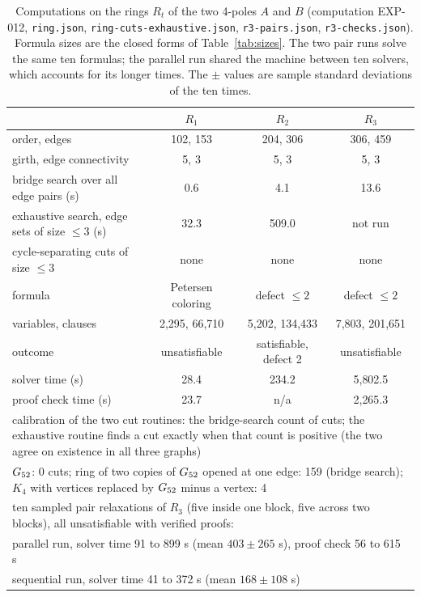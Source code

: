 \begin{table}[t]\centering\footnotesize
\setlength{\tabcolsep}{3pt}
\begin{tabular}{lccc}
\toprule
 & $R_1$ & $R_2$ & $R_3$ \\
\midrule
order, edges & 102, 153 & 204, 306 & 306, 459 \\
girth, edge connectivity & 5, 3 & 5, 3 & 5, 3 \\
bridge search over all edge pairs (s) & 0.6 & 4.1 & 13.6 \\
exhaustive search, edge sets of size $\le 3$ (s) & 32.3 & 509.0 & not run \\
cycle-separating cuts of size $\le 3$ & none & none & none \\
formula & Petersen coloring & defect $\le 2$ & defect $\le 2$ \\
variables, clauses & 2{,}295, 66{,}710 & 5{,}202, 134{,}433 & 7{,}803, 201{,}651 \\
outcome & unsatisfiable & satisfiable, defect 2 & unsatisfiable \\
solver time (s) & 28.4 & 234.2 & 5{,}802.5 \\
proof check time (s) & 23.7 & n/a & 2{,}265.3 \\
\midrule
\multicolumn{4}{p{10.6cm}}{calibration of the two cut routines: the bridge-search count of cuts; the exhaustive routine finds a cut exactly when that count is positive (the two agree on existence in all three graphs)} \\
\multicolumn{4}{p{10.6cm}}{\quad $G_{52}$: 0 cuts; ring of two copies of $G_{52}$ opened at one edge: 159 (bridge search); $K_4$ with vertices replaced by $G_{52}$ minus a vertex: 4} \\
\midrule
\multicolumn{4}{p{10.6cm}}{ten sampled pair relaxations of $R_3$ (five inside one block, five across two blocks), all unsatisfiable with verified proofs:} \\
\multicolumn{4}{p{10.6cm}}{\quad parallel run, solver time 91 to 899 s (mean $403 \pm 265$ s), proof check 56 to 615 s} \\
\multicolumn{4}{p{10.6cm}}{\quad sequential run, solver time 41 to 372 s (mean $168 \pm 108$ s)} \\
\bottomrule
\end{tabular}
\caption{Computations on the rings $R_t$ of the two 4-poles $A$ and $B$ (computation EXP-012, \texttt{ring.json}, \texttt{ring-cuts-exhaustive.json}, \texttt{r3-pairs.json}, \texttt{r3-checks.json}). Formula sizes are the closed forms of Table~\ref{tab:sizes}. The two pair runs solve the same ten formulas; the parallel run shared the machine between ten solvers, which accounts for its longer times. The $\pm$ values are sample standard deviations of the ten times.}\label{tab:rings}
\end{table}
